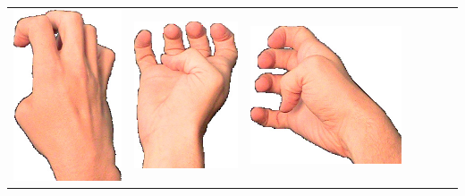 \documentclass{article}
\begin{document}
\begin{center}
\begin{tabular}{r*{6}{c}}
\includegraphics[scale=0.1]{images/04-02-3.jpg}&
\includegraphics[scale=0.1]{images/04-02-4.jpg}&
\includegraphics[scale=0.1]{images/04-02-5.jpg}&

\end{tabular}
\end{center}
\end{document}

